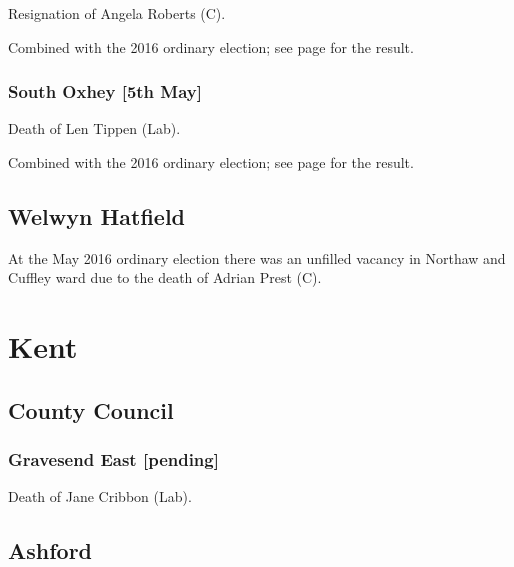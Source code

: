 \documentclass[a4paper,openany]{book}
\begin{document}
\begin{resultsiii}
Resignation of Angela Roberts (C).

Combined with the 2016 ordinary election; see page \pageref{CarpendersParkThreeRivers} for the result.

\subsubsection*{South Oxhey \hspace*{\fill}\nolinebreak[1]%
\enspace\hspace*{\fill}
[5th May]}


Death of Len Tippen (Lab).

Combined with the 2016 ordinary election; see page \pageref{SouthOxheyThreeRivers} for the result.

\subsection*{Welwyn Hatfield}

At the May 2016 ordinary election there was an unfilled vacancy in Northaw and Cuffley ward due to the death of Adrian Prest (C).

\section{Kent}

\subsection*{County Council}

\subsubsection*{Gravesend East \hspace*{\fill}\nolinebreak[1]%
\enspace\hspace*{\fill}
[pending]}


Death of Jane Cribbon (Lab).

\subsection*{Ashford}


\end{resultsiii}
\end{document}
